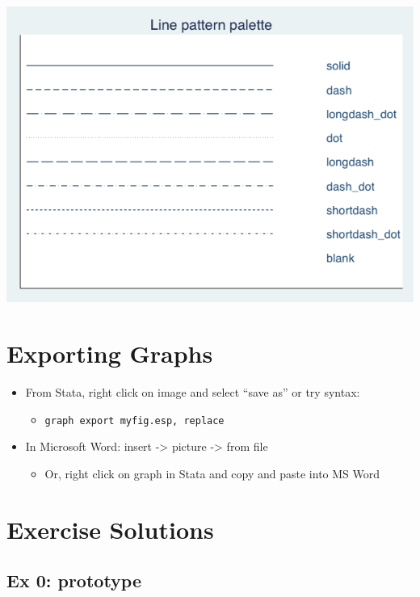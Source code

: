 \documentclass[]{book}
\providecommand{\tightlist}{%
  \setlength{\itemsep}{0pt}\setlength{\parskip}{0pt}}
\begin{document}
\includegraphics{Stata/StataModGraph/images/linepalette.png}

\hypertarget{exporting-graphs}{%
\section{Exporting Graphs}\label{exporting-graphs}}

\begin{itemize}
\tightlist
\item
  From Stata, right click on image and select ``save as'' or try syntax:

  \begin{itemize}
  \tightlist
  \item
    \texttt{graph\ export\ myfig.esp,\ replace}
  \end{itemize}
\item
  In Microsoft Word: insert -\textgreater{} picture -\textgreater{} from file

  \begin{itemize}
  \tightlist
  \item
    Or, right click on graph in Stata and copy and paste into MS Word
  \end{itemize}
\end{itemize}

\hypertarget{exercise-solutions-8}{%
\section{Exercise Solutions}\label{exercise-solutions-8}}

\hypertarget{ex-0-prototype-8}{%
\subsection{Ex 0: prototype}\label{ex-0-prototype-8}}
\end{document}
